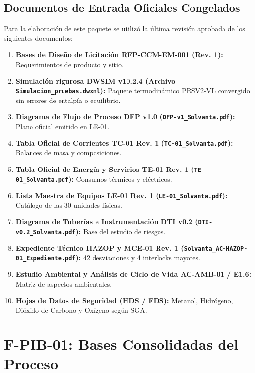 \documentclass[10pt,letterpaper]{article}
\begin{document}
\subsection{Documentos de Entrada Oficiales Congelados}
Para la elaboración de este paquete se utilizó la última revisión aprobada de los siguientes documentos:
\begin{enumerate}
    \item \textbf{Bases de Diseño de Licitación RFP-CCM-EM-001 (Rev. 1):} Requerimientos de producto y sitio.
    \item \textbf{Simulación rigurosa DWSIM v10.2.4 (Archivo \texttt{Simulacion\_pruebas.dwxml}):} Paquete termodinámico PRSV2-VL convergido sin errores de entalpía o equilibrio.
    \item \textbf{Diagrama de Flujo de Proceso DFP v1.0 (\texttt{DFP-v1\_Solvanta.pdf}):} Plano oficial emitido en LE-01.
    \item \textbf{Tabla Oficial de Corrientes TC-01 Rev. 1 (\texttt{TC-01\_Solvanta.pdf}):} Balances de masa y composiciones.
    \item \textbf{Tabla Oficial de Energía y Servicios TE-01 Rev. 1 (\texttt{TE-01\_Solvanta.pdf}):} Consumos térmicos y eléctricos.
    \item \textbf{Lista Maestra de Equipos LE-01 Rev. 1 (\texttt{LE-01\_Solvanta.pdf}):} Catálogo de las 30 unidades físicas.
    \item \textbf{Diagrama de Tuberías e Instrumentación DTI v0.2 (\texttt{DTI-v0.2\_Solvanta.pdf}):} Base del estudio de riesgos.
    \item \textbf{Expediente Técnico HAZOP y MCE-01 Rev. 1 (\texttt{Solvanta\_AC-HAZOP-01\_Expediente.pdf}):} 42 desviaciones y 4 interlocks mayores.
    \item \textbf{Estudio Ambiental y Análisis de Ciclo de Vida AC-AMB-01 / E1.6:} Matriz de aspectos ambientales.
    \item \textbf{Hojas de Datos de Seguridad (HDS / FDS):} Metanol, Hidrógeno, Dióxido de Carbono y Oxígeno según SGA.
\end{enumerate}

\newpage
\section{F-PIB-01: Bases Consolidadas del Proceso}
\end{document}

